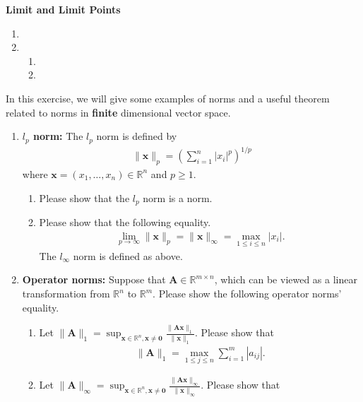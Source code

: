 \documentclass[11pt,letter,notitlepage]{article}
\theoremstyle{definition}
\begin{document}
\begin{solution} \textbf{Limit and Limit Points}
\begin{enumerate}
\item 
\item
\begin{enumerate}
	\item 
	\item
\end{enumerate}
\end{enumerate}
\end{solution}

\newpage

\begin{exercise}[Norms]
    In this exercise, we will give some examples of norms and a useful theorem related to norms in \textbf{finite} dimensional vector space.
    \begin{enumerate}
        \item \textbf{$l_p$ norm:} The $l_p$ norm is defined by
        \begin{align*}
			\|\mathbf{x}\|_p = \left(\sum_{i=1}^n |x_i|^p\right)^{1/p}
		\end{align*}
		where $\mathbf{x}=(x_1,\dots,x_n)\in \mathbb{R}^n$ and $p\ge 1$. 
		\begin{enumerate}
			\item Please show that the $l_p$ norm is a norm.
			\item Please show that the following equality.
			\begin{align*}
				\lim_{p\rightarrow \infty}\|\mathbf{x}\|_p = \|\mathbf{x}\|_{\infty} = \max_{1\le i\le n}|x_i|.
			\end{align*}
			The $l_{\infty}$ norm is defined as above.
		\end{enumerate}
		\item \textbf{Operator norms:} Suppose that $\mathbf{A}\in \mathbb{R}^{m\times n}$, which can be viewed as a linear transformation from $\mathbb{R}^n$ to $\mathbb{R}^m$. Please show the following operator norms' equality.
		\begin{enumerate}
			\item Let $\|\mathbf{A}\|_1 = \sup_{\mathbf{x}\in \mathbb{R}^n, \mathbf{x}\not=\mathbf{0}}\frac{\|\mathbf{Ax}\|_1}{\|\mathbf{x}\|_1}$. Please show that
			\begin{align*}
				\|\mathbf{A}\|_1 = \max_{1\le j\le n}\sum_{i=1}^m|a_{ij}|.
			\end{align*}
			\item Let $\|\mathbf{A}\|_{\infty} = \sup_{\mathbf{x}\in \mathbb{R}^n, \mathbf{x}\not=\mathbf{0}}\frac{\|\mathbf{Ax}\|_{\infty}}{\|\mathbf{x}\|_{\infty}}$. Please show that

\end{enumerate}
\end{enumerate}
\end{exercise}
\end{document}
